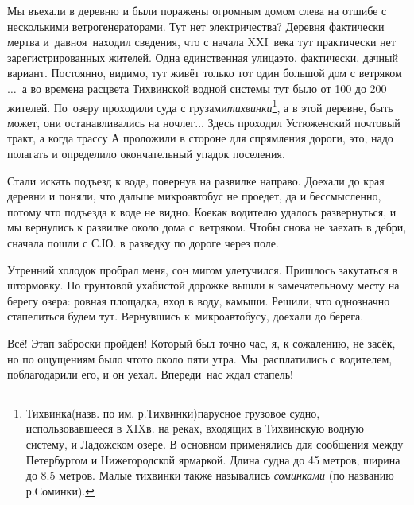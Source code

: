 Мы въехали в деревню и были поражены огромным домом слева на отшибе с несколькими ветрогенераторами. Тут нет электричества? Деревня фактически мертва и~давно\mdash я~находил сведения, что с начала XXI~века тут практически нет зарегистрированных жителей. Одна единственная улица\mdash это, фактически, дачный вариант. Постоянно, видимо, тут живёт только тот один большой дом с ветряком$\ldots$~а во времена расцвета Тихвинской водной системы тут было от 100 до 200 жителей. По~озеру проходили суда с грузами\mdash \textit{тихвинки}\footnote[1]{Тихвинка\thinspace(назв. по им. р.\thinspace Тихвинки)\mdash парусное грузовое судно, использовавшееся в XIX\thinspace в. на реках, входящих в Тихвинскую водную систему, и Ладожском озере. В основном применялись для сообщения между Петербургом и Нижегородской ярмаркой. Длина судна до 45 метров, ширина до 8.5 метров. Малые тихвинки также назывались \textit{соминками} \cite{МорскойСправочник} (по названию р.\thinspace Соминки).}, а в этой деревне, быть может, они останавливались на ночлег$\ldots$ Здесь проходил Устюженский почтовый тракт, а когда трассу А проложили в стороне для спрямления дороги, это, надо полагать и определило окончательный упадок поселения.

Стали искать подъезд к воде, повернув на развилке направо. Доехали до края деревни и поняли, что дальше микроавтобус не проедет, да и бессмысленно, потому что подъезда к воде не видно. Кое\sdash как водителю удалось развернуться, и мы вернулись к развилке около дома с~ветряком. Чтобы снова не заехать в дебри, сначала пошли с С.Ю. в разведку по дороге через поле. 

Утренний холодок пробрал меня, сон мигом улетучился. Пришлось закутаться в штормовку. По грунтовой ухабистой дорожке вышли к замечательному месту на берегу озера: ровная площадка, вход в воду, камыши. Решили, что однозначно стапелиться будем тут. Вернувшись к~микроавтобусу, доехали до берега. 

Всё! Этап заброски пройден! Который был точно час, я, к сожалению, не засёк, но по ощущениям было что\sdash то около пяти утра. Мы~расплатились с водителем, поблагодарили его, и он уехал. Впереди~нас ждал стапель!

\begin{center}
\end{center}
